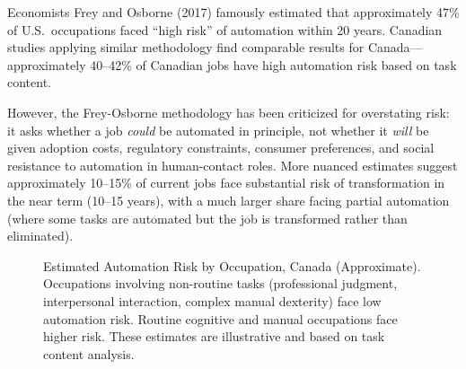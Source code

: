 Economists Frey and Osborne (2017) famously estimated that approximately 47\% of U.S.\ occupations faced ``high risk'' of automation within 20 years. Canadian studies applying similar methodology find comparable results for Canada---approximately 40--42\% of Canadian jobs have high automation risk based on task content.

However, the Frey-Osborne methodology has been criticized for overstating risk: it asks whether a job \textit{could} be automated in principle, not whether it \textit{will} be given adoption costs, regulatory constraints, consumer preferences, and social resistance to automation in human-contact roles. More nuanced estimates suggest approximately 10--15\% of current jobs face substantial risk of transformation in the near term (10--15 years), with a much larger share facing partial automation (where some tasks are automated but the job is transformed rather than eliminated).

\begin{figure}[H]
\centering
{}
\caption{Estimated Automation Risk by Occupation, Canada (Approximate). Occupations
  involving non-routine tasks (professional judgment, interpersonal interaction, complex
  manual dexterity) face low automation risk. Routine cognitive and manual occupations
  face higher risk. These estimates are illustrative and based on task content analysis.}
\label{fig:automation_risk}
\end{figure}

